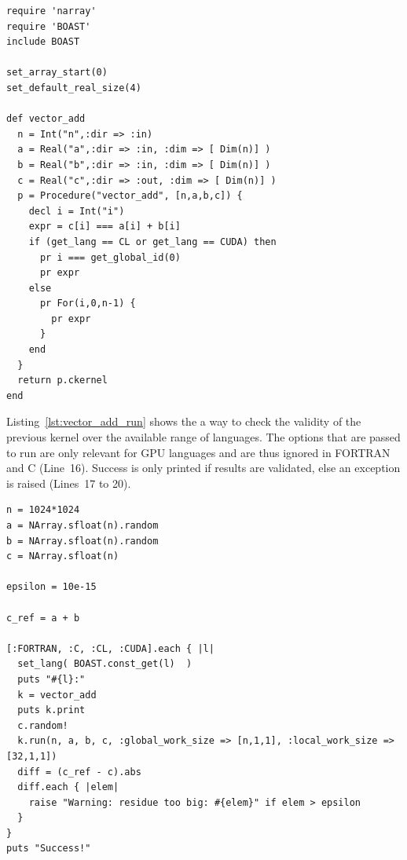 \documentclass[11pt, a4paper, twoside]{montblanc}
\begin{document}
\begin{lstlisting}
require 'narray'
require 'BOAST'
include BOAST

set_array_start(0)
set_default_real_size(4)

def vector_add
  n = Int("n",:dir => :in)
  a = Real("a",:dir => :in, :dim => [ Dim(n)] )
  b = Real("b",:dir => :in, :dim => [ Dim(n)] )
  c = Real("c",:dir => :out, :dim => [ Dim(n)] )
  p = Procedure("vector_add", [n,a,b,c]) {
    decl i = Int("i")
    expr = c[i] === a[i] + b[i]
    if (get_lang == CL or get_lang == CUDA) then
      pr i === get_global_id(0)
      pr expr
    else
      pr For(i,0,n-1) {
        pr expr
      }
    end
  }
  return p.ckernel
end
\end{lstlisting}

Listing~\ref{lst:vector_add_run} shows the a way to check the validity of the
previous kernel over the available range of languages. The options that are
passed to run are only relevant for GPU languages and are thus ignored in
FORTRAN and C (Line~16). Success is only printed if results are validated,
else an exception is raised (Lines~17 to 20).

\begin{lstlisting}
n = 1024*1024
a = NArray.sfloat(n).random
b = NArray.sfloat(n).random
c = NArray.sfloat(n)

epsilon = 10e-15

c_ref = a + b

[:FORTRAN, :C, :CL, :CUDA].each { |l|
  set_lang( BOAST.const_get(l)  )
  puts "#{l}:"
  k = vector_add
  puts k.print
  c.random!
  k.run(n, a, b, c, :global_work_size => [n,1,1], :local_work_size => [32,1,1])
  diff = (c_ref - c).abs
  diff.each { |elem|
    raise "Warning: residue too big: #{elem}" if elem > epsilon
  }
}
puts "Success!"
\end{lstlisting}
\end{document}
